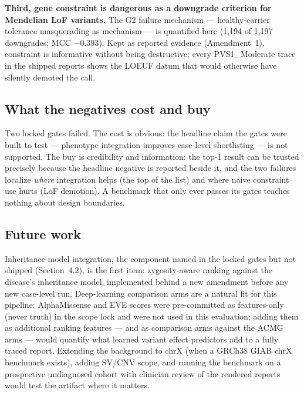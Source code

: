 \documentclass[11pt]{article}
\begin{document}
\textbf{Third, gene constraint is dangerous as a downgrade criterion for Mendelian
LoF variants.} The G2 failure mechanism --- healthy-carrier tolerance masquerading
as mechanism --- is quantified here (1,194 of 1,197 downgrades; MCC $-0.393$).
Kept as reported evidence (Amendment~1), constraint is informative without being
destructive; every PVS1\_Moderate trace in the shipped reports shows the LOEUF datum
that would otherwise have silently demoted the call.

\subsection{What the negatives cost and buy}
Two locked gates failed. The cost is obvious: the headline claim the gates were
built to test --- phenotype integration improves case-level shortlisting --- is not
supported. The buy is credibility and information: the top-1 result can be trusted
precisely because the headline negative is reported beside it, and the two failures
localize \emph{where} integration helps (the top of the list) and where naive
constraint use hurts (LoF demotion). A benchmark that only ever passes its gates
teaches nothing about design boundaries.

\subsection{Future work}
\label{sec:future}
Inheritance-model integration, the component named in the locked gates but not
shipped (Section~4.2), is the first item: zygosity-aware ranking against the
disease's inheritance model, implemented behind a new amendment before any new
case-level run. Deep-learning comparison arms are a natural fit for this pipeline:
AlphaMissense and EVE scores were pre-committed as features-only (never truth) in
the scope lock and were not used in this evaluation; adding them as additional
ranking features --- and as comparison arms against the ACMG arms --- would quantify
what learned variant effect predictors add to a fully traced report. Extending the
background to chrX (when a GRCh38 GIAB chrX benchmark exists), adding SV/CNV scope,
and running the benchmark on a prospective undiagnosed cohort with clinician review
of the rendered reports would test the artifact where it matters.
\end{document}
